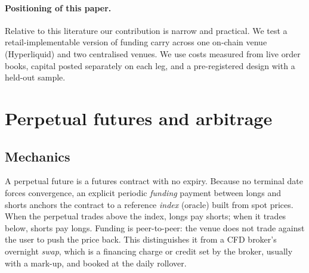 \documentclass[11pt,a4paper]{article}
\begin{document}
\paragraph{Positioning of this paper.}
Relative to this literature our contribution is narrow and practical. We test a retail-implementable version of funding carry across one on-chain venue (Hyperliquid) and two centralised venues. We use costs measured from live order books, capital posted separately on each leg, and a pre-registered design with a held-out sample.

\section{Perpetual futures and arbitrage}
\label{sec:perps}

\subsection{Mechanics}
A perpetual future is a futures contract with no expiry. Because no terminal date forces convergence, an explicit periodic \emph{funding} payment between longs and shorts anchors the contract to a reference \emph{index} (oracle) built from spot prices.
When the perpetual trades above the index, longs pay shorts; when it trades below, shorts pay longs.
Funding is peer-to-peer: the venue does not trade against the user to push the price back.
This distinguishes it from a CFD broker's overnight \emph{swap}, which is a financing charge or credit set by the broker, usually with a mark-up, and booked at the daily rollover.
\end{document}
